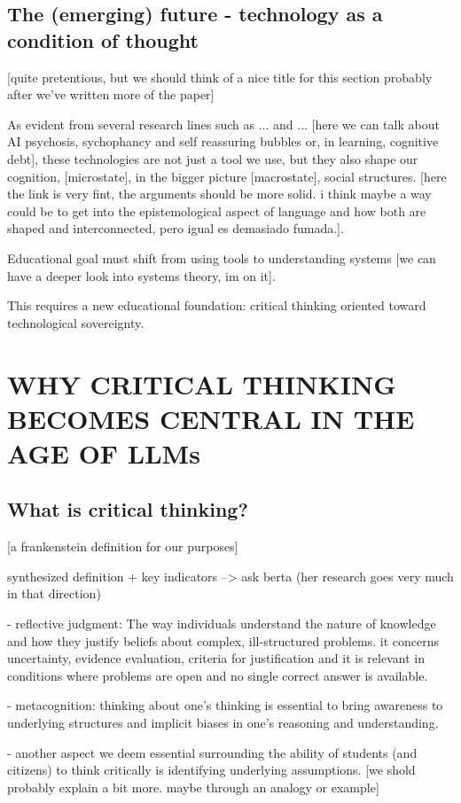 \documentclass{article}
\begin{document}
\subsection{The (emerging) future - technology as a condition of thought}
[quite pretentious, but we should think of a nice title for this section probably after we've written more of the paper]

As evident from several research lines such as ... and ... [here we can talk about AI psychosis, sychophancy and self reassuring bubbles or, in learning, cognitive debt], these technologies are not just a tool we use, but they also shape our cognition, [microstate], in the bigger picture [macrostate], social structures. [here the link is very fint, the arguments should be more solid. i think maybe a way could be to get into the epistemological aspect of language and how both are shaped and interconnected, pero igual es demasiado fumada.].


Educational goal must shift from using tools to understanding systems [we can have a deeper look into systems theory, im on it]. 

This requires a new educational foundation: critical thinking oriented toward technological sovereignty.

\section{WHY CRITICAL THINKING BECOMES CENTRAL IN THE AGE OF LLMs}

\subsection{What is critical thinking?}
[a frankenstein definition for our purposes]

synthesized definition + key indicators --> ask berta (her research goes very much in that direction)

- reflective judgment: The way individuals understand the nature of knowledge and how they justify beliefs about complex, ill-structured problems. it concerns uncertainty, evidence evaluation, criteria for justification and it is relevant in conditions where problems are open and no single correct answer is available. \cite{KITCHENER198189}

- metacognition: thinking about one's thinking is essential to bring awareness to underlying structures and implicit biases in one's reasoning and understanding.

- another aspect we deem essential surrounding the ability of students (and citizens) to think critically is identifying underlying assumptions. [we shold probably explain a bit more. maybe through an analogy or example]
\end{document}
